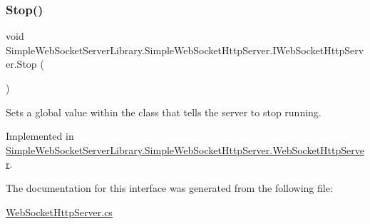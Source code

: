 \subsubsection{\texorpdfstring{Stop()}{Stop()}}
{\footnotesize\ttfamily void Simple\+Web\+Socket\+Server\+Library.\+Simple\+Web\+Socket\+Http\+Server.\+I\+Web\+Socket\+Http\+Server.\+Stop (\begin{DoxyParamCaption}{ }\end{DoxyParamCaption})}



Sets a global value within the class that tells the server to stop running. 



Implemented in \mbox{\hyperlink{class_simple_web_socket_server_library_1_1_simple_web_socket_http_server_1_1_web_socket_http_server_af61f4c057d2af50ed5b8942424dbf3ad}{Simple\+Web\+Socket\+Server\+Library.\+Simple\+Web\+Socket\+Http\+Server.\+Web\+Socket\+Http\+Server}}.



The documentation for this interface was generated from the following file\+:\begin{DoxyCompactItemize}
\item 
\mbox{\hyperlink{_web_socket_http_server_8cs}{Web\+Socket\+Http\+Server.\+cs}}\end{DoxyCompactItemize}
